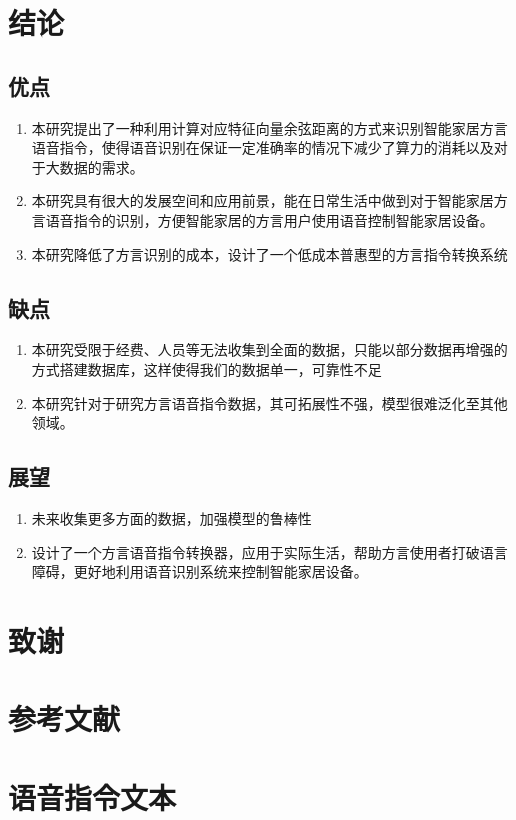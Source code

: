 \documentclass[lang=cn,cite=super]{elegantpaper}
\begin{document}
\section{结论}
\subsection{优点}
\begin{enumerate}
    \item 本研究提出了一种利用计算对应特征向量余弦距离的方式来识别智能家居方言语音指令，使得语音识别在保证一定准确率的情况下减少了算力的消耗以及对于大数据的需求。
    \item 本研究具有很大的发展空间和应用前景，能在日常生活中做到对于智能家居方言语音指令的识别，方便智能家居的方言用户使用语音控制智能家居设备。
    \item 本研究降低了方言识别的成本，设计了一个低成本普惠型的方言指令转换系统 
\end{enumerate}
\subsection{缺点}
\begin{enumerate}
    \item 本研究受限于经费、人员等无法收集到全面的数据，只能以部分数据再增强的方式搭建数据库，这样使得我们的数据单一，可靠性不足
    \item 本研究针对于研究方言语音指令数据，其可拓展性不强，模型很难泛化至其他领域。
\end{enumerate}
\subsection{展望}
\begin{enumerate}
    \item 未来收集更多方面的数据，加强模型的鲁棒性
    \item 设计了一个方言语音指令转换器，应用于实际生活，帮助方言使用者打破语言障碍，更好地利用语音识别系统来控制智能家居设备。 
\end{enumerate}
\section*{致谢}
\newpage
\section*{参考文献}

\appendix
\section{语音指令文本}
\label{appendix:A}
\end{document}
